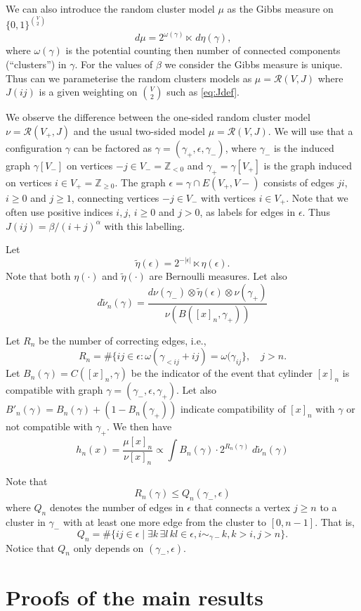 \documentclass[11pt, a4paper]{amsart}
\theoremstyle{definition}
\theoremstyle{remark}
\renewcommand{\d}{\,d}
\providecommand{\ZZ}{\mathbb{Z}}
\providecommand{\mscr}{\mathscr}
\providecommand{\e}{\epsilon}
\providecommand{\g}{\gamma}
\providecommand{\w}{\omega}
\begin{document}
We can also introduce the random cluster model $\mu$ as the Gibbs measure on
$\{0,1\}^{\binom V2}$
$$ \d\mu = 2^{\w(\g)} \ltimes \d\eta(\g), $$
where $\w(\g)$ is the potential counting then number of connected components
(``clusters'') in $\g$. For the values of $\beta$ we consider the Gibbs measure
is unique. Thus can we parameterise the random clusters models as
$\mu = \mscr R(V,J)$ where $J(ij)$ is a given weighting on $\binom V2$ such as
\eqref{eq:Jdef}.

We observe the  difference between the one-sided random cluster model $\nu = \mscr R(V_+,J)$ and
the usual two-sided model $\mu = \mscr R(V,J)$. We will use that a configuration
$\g$ can be factored as $\g = (\g_+, \e, \g_-)$, where $\g_-$ is the induced
graph $\g[V_-]$ on vertices $-j\in V_-=\ZZ_{<0}$ and $\g_+=\g[V_+]$ is the graph
induced on vertices $i\in V_+=\ZZ_{\ge0}$. The graph $\e=\g\cap E(V_+,V-)$
consists of edges $ji$, $i\ge0$ and $j\ge 1$, connecting vertices $-j\in V_-$
with vertices $i\in V_+$. Note that we often use positive indices $i,j$, $i\ge0$
and $j>0$, as labels for edges in $\e$. Thus $J(ij)=\beta/(i+j)^\alpha$ with
this labelling.

Let
$$
\tilde \eta(\epsilon)= 2^{-|\epsilon|} \ltimes \eta (\epsilon).
$$
Note that both $\eta(\cdot)$ and $\tilde\eta (\cdot)$ are Bernoulli measures.
Let also
$$
d\tilde \nu_n(\gamma) =
\frac{d\nu(\gamma_-)\otimes \tilde \eta(\epsilon)\otimes \nu(\gamma_+)}{\nu(B([x]_n,\gamma_+))}
$$

Let $R_n$ be the number of correcting edges, i.e.,
$$
R_n=\# \{ij\in \epsilon: \omega (\gamma_{< ij}+ij)=\omega (\gamma_{ij}\},\quad j>n.
$$
Let $B_n(\g)=C([x]_n,\gamma)$ be the indicator of the event that cylinder $[x]_n$ is compatible with graph $\g=(\g_-,\e,\g_+)$.
Let also $B'_n(\g) = B_n(\g) + (1-B_n(\g_+))$ indicate compatibility of $[x]_n$ with $\g$ or not compatible with $\g_+$.
We then have
\[
  h_n(x) = \frac{\mu [x]_n}{\nu [x]_n}\propto \int B_n(\g) \cdot 2^{R_n(\g)} \; d\tilde \nu_n (\gamma)
\]

Note that
$$ R_n(\g) \le Q_n(\g_-,\e) $$
where $Q_n$ denotes the number of edges in $\e$ that connects a vertex $j\ge n$ to a
cluster in $\g_-$ with at least one more edge from the cluster to $[0,n-1]$. That is,
$$  Q_n=\# \{ij \in \epsilon \mid  \exists k\, \exists l\, kl\in\e,  i \sim_{\gamma-} k, k>i, j > n\}.$$
Notice that $Q_n$ only depends on $(\gamma_-,\epsilon)$.



\section{Proofs of the main results}\noindent
\end{document}
